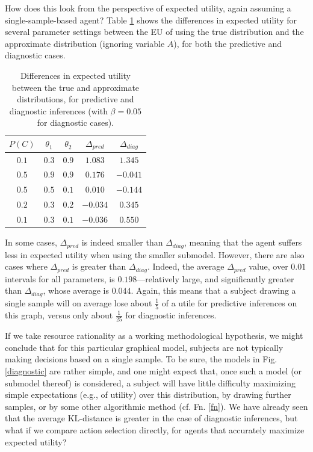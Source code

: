 \documentclass[10pt,letterpaper]{article}
\begin{document}
How does this look from the perspective of expected utility, again assuming a single-sample-based agent?  Table \ref{predictive} shows the differences in expected utility for several parameter settings between the EU of using the true distribution and the approximate distribution (ignoring variable $A$), for both the predictive and diagnostic cases. 
\begin{table}[h]  \begin{center}
\begin{tabular}{c | c | c || c | c}
 $P(C)$ & $\theta_1$ & $\theta_2$ & $\Delta_{pred}$ & $\Delta_{diag}$ \\ \hline
  $0.1$ & $0.3$ & $0.9$ & $1.083$ & $1.345$ \\
 $0.5$ & $0.9$ &  $0.9$ & $0.176$ & $-0.041$ \\
 $0.5$ & $0.5$ & $0.1$ & $0.010$ & $-0.144$ \\
  $0.2$ & $0.3$ & $0.2$ & $-0.034$ & $0.345$ \\
 $0.1$ & $0.3$ & $0.1$ & $-0.036$ & $0.550$ \\

\end{tabular} \end{center} \caption{Differences in expected utility between the true and approximate distributions, for predictive and diagnostic inferences (with $\beta = 0.05$ for diagnostic cases).} \label{predictive}
\end{table} 
In some cases, $\Delta_{pred}$ is indeed smaller than $\Delta_{diag}$, meaning that the agent suffers less in expected utility when using the smaller submodel. However, there are also cases where $\Delta_{pred}$ is greater than $\Delta_{diag}$. Indeed, the average $\Delta_{pred}$ value, over $0.01$ intervals for all parameters, is $0.198$---relatively large, and significantly greater than $\Delta_{diag}$, whose average is $0.044$. Again, this means that a subject drawing a single sample will on average lose about $\frac{1}{5}$ of a utile for predictive inferences on this graph, versus only about $\frac{1}{25}$ for diagnostic inferences.

If we take resource rationality as a working methodological hypothesis, we might conclude that for this particular graphical model, subjects are not typically making decisions based on a single sample. To be sure, the models in Fig. \ref{diagnostic} are rather simple, and one might expect that, once such a model (or submodel thereof) is considered, a subject will have little difficulty maximizing simple expectations (e.g., of utility) over this distribution, by drawing further samples, or by some other algorithmic method (cf. Fn. \ref{fn}). We have already seen that the average KL-distance is greater in the case of diagnostic inferences, but what if we compare action selection directly, for agents that accurately maximize expected utility?
\end{document}
